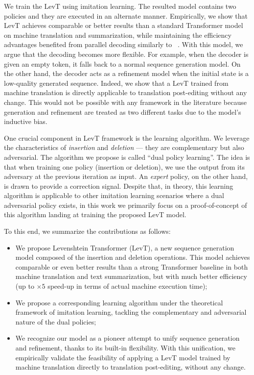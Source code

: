 \documentclass{article}
\begin{document}
We train the LevT using imitation learning. The resulted model contains two policies and they are executed in an alternate manner. Empirically, we show that LevT achieves comparable or better results than a standard Transformer model on machine translation and summarization, while maintaining the efficiency advantages benefited from parallel decoding similarly to ~\citep{lee2018deterministic}.
With this model, we argue that the decoding becomes more flexible. For example, when the decoder is given an empty token, it falls back to a normal sequence generation model.
On the other hand, the decoder acts as a refinement model when the initial state is a low-quality generated sequence. 
Indeed, we show that a LevT trained from machine translation is directly applicable to translation post-editing without any change. This would not be possible with any framework in the literature because generation and refinement are treated as two different tasks due to the model's inductive bias.

One crucial component in LevT framework is the learning algorithm. 
We leverage the characteristics of \emph{insertion} and \emph{deletion} --- they are complementary but also adversarial.
The algorithm we propose is called ``dual policy learning''.
The idea is that when training one policy (insertion or deletion), we use the output from its adversary at the previous iteration as input. 
An \emph{expert} policy, on the other hand, is drawn to provide a correction signal.
Despite that, in theory, this learning algorithm is applicable to other imitation learning scenarios where a dual adversarial policy exists, in this work we primarily focus on a proof-of-concept of this algorithm landing at training the proposed LevT model. 

To this end, we summarize the contributions as follows:
\begin{itemize}[leftmargin=*]
\item We propose Levenshtein Transformer (LevT), a new sequence generation model composed of the insertion and deletion operations.
    This model achieves comparable or even better results than a strong Transformer baseline in both machine translation and text summarization, but with much better efficiency (up to $\times 5$ speed-up in terms of actual machine execution time);
    \item  We propose a corresponding learning algorithm under the theoretical framework of imitation learning, tackling the complementary and adversarial nature of the dual policies;
    \item We recognize our model as a pioneer attempt to unify sequence generation and refinement, thanks to its built-in flexibility. With this unification, we empirically validate the feasibility of applying a LevT model trained by machine translation directly to translation post-editing, without any change. 
\end{itemize}
\end{document}
